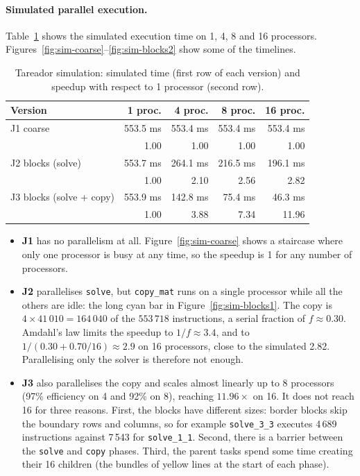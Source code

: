 \documentclass[11pt,a4paper]{article}
\begin{document}
\paragraph{Simulated parallel execution.}
Table~\ref{tab:tareador-jacobi} shows the simulated execution time on 1, 4, 8 and 16 processors. Figures~\ref{fig:sim-coarse}--\ref{fig:sim-blocks2} show some of the timelines.

\begin{table}[H]
\centering
\begin{tabular}{lrrrr}
\toprule
Version & 1 proc. & 4 proc. & 8 proc. & 16 proc. \\
\midrule
J1 coarse          & 553.5 ms & 553.4 ms & 553.4 ms & 553.4 ms \\
                   & 1.00     & 1.00     & 1.00     & 1.00 \\
J2 blocks (solve)  & 553.7 ms & 264.1 ms & 216.5 ms & 196.1 ms \\
                   & 1.00     & 2.10     & 2.56     & 2.82 \\
J3 blocks (solve + copy) & 553.9 ms & 142.8 ms & 75.4 ms & 46.3 ms \\
                   & 1.00     & 3.88     & 7.34     & 11.96 \\
\bottomrule
\end{tabular}
\caption{Tareador simulation: simulated time (first row of each version) and speedup with respect to 1 processor (second row).}
\label{tab:tareador-jacobi}
\end{table}

\begin{itemize}
  \item \textbf{J1} has no parallelism at all. Figure~\ref{fig:sim-coarse} shows a staircase where only one processor is busy at any time, so the speedup is 1 for any number of processors.
  \item \textbf{J2} parallelises \texttt{solve}, but \texttt{copy\_mat} runs on a single processor while all the others are idle: the long cyan bar in Figure~\ref{fig:sim-blocks1}. The copy is $4 \times 41\,010 = 164\,040$ of the $553\,718$ instructions, a serial fraction of $f \approx 0.30$. Amdahl's law limits the speedup to $1/f \approx 3.4$, and to $1/(0.30 + 0.70/16) \approx 2.9$ on 16 processors, close to the simulated 2.82. Parallelising only the solver is therefore not enough.
  \item \textbf{J3} also parallelises the copy and scales almost linearly up to 8 processors (97\% efficiency on 4 and 92\% on 8), reaching $11.96\times$ on 16. It does not reach 16 for three reasons. First, the blocks have different sizes: border blocks skip the boundary rows and columns, so for example \texttt{solve\_3\_3} executes 4\,689 instructions against 7\,543 for \texttt{solve\_1\_1}. Second, there is a barrier between the \texttt{solve} and \texttt{copy} phases. Third, the parent tasks spend some time creating their 16 children (the bundles of yellow lines at the start of each phase).
\end{itemize}
\end{document}
